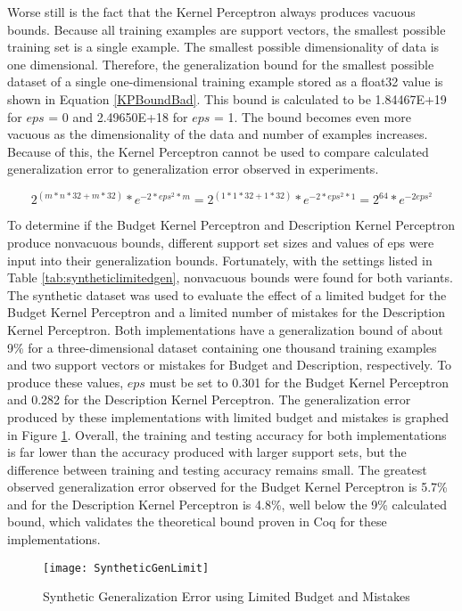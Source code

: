 Worse still is the fact that the Kernel Perceptron always produces vacuous bounds. Because all training examples are support vectors, the smallest possible training set is a single example. The smallest possible dimensionality of data is one dimensional. Therefore, the generalization bound for the smallest possible dataset of a single one-dimensional training example stored as a float32 value is shown in Equation \ref{KPBoundBad}. This bound is calculated to be 1.84467E+19 for $eps$ = 0 and 2.49650E+18 for $eps$ = 1. The bound becomes even more vacuous as the dimensionality of the data and number of examples increases. Because of this, the Kernel Perceptron cannot be used to compare calculated generalization error to generalization error observed in experiments.

\begin{equation} \label{KPBoundBad}
 2^{(m*n*32 + m*32)} * e^{-2*eps^{2}*m} = 2^{(1*1*32 + 1*32)} * e^{-2*eps^{2}*1} = 2^{64}*e^{-2eps^{2}}
\end{equation}

To determine if the Budget Kernel Perceptron and Description Kernel Perceptron produce nonvacuous bounds, different support set sizes and values of eps were input into their generalization bounds. Fortunately, with the settings listed in Table \ref{tab:syntheticlimitedgen}, nonvacuous bounds were found for both variants. The synthetic dataset was used to evaluate the effect of a limited budget for the Budget Kernel Perceptron and a limited number of mistakes for the Description Kernel Perceptron. Both implementations have a generalization bound of about 9\% for a three-dimensional dataset containing one thousand training examples and two support vectors or mistakes for Budget and Description, respectively. To produce these values, $eps$ must be set to 0.301 for the Budget Kernel Perceptron and 0.282 for the Description Kernel Perceptron. The generalization error produced by these implementations with limited budget and mistakes is graphed in Figure \ref{SyntheticGenErr2Fig}. Overall, the training and testing accuracy for both implementations is far lower than the accuracy produced with larger support sets, but the difference between training and testing accuracy remains small. The greatest observed generalization error observed for the Budget Kernel Perceptron is 5.7\% and for the Description Kernel Perceptron is 4.8\%, well below the 9\% calculated bound, which validates the theoretical bound proven in Coq for these implementations.

\begin{figure}[h]
 \caption{Synthetic Generalization Error using Limited Budget and Mistakes}
 \label{SyntheticGenErr2Fig}
 \begin{center}
  \texttt{[image: SyntheticGenLimit]} 
 \end{center}
\end{figure}

